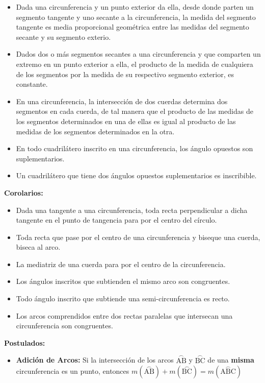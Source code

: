 \documentclass[•]{article}
\begin{document}
\begin{flushleft}
\begin{itemize}
			\item Dada una circunferencia y un punto exterior da ella, desde donde parten un segmento tangente y uno secante a la circunferencia, la medida del segmento tangente es media proporcional geom\'etrica entre las medidas del segmento secante y su segmento exterio.
			
			\item Dados dos o m\'as segmentos secantes a una circunferencia y que comparten un extremo en un punto exterior a ella, el producto de la medida de cualquiera de los segmentos por la medida de su respectivo segmento exterior, es constante.
			
			\item En una circunferencia, la intersecci\'on de dos cuerdas determina dos segmentos en cada cuerda, de tal manera que el producto de las medidas de los segmentos determinados en una de ellas es igual al producto de las medidas de los segmentos determinados en la otra.
			
			\item En todo cuadril\'atero inscrito en una circunferencia, los \'angulo opuestos son suplementarios.
			
			\item Un cuadril\'atero que tiene dos \'angulos opuestos suplementarios es inscribible.
			
		\end{itemize}
		
		\textbf{Corolarios: }
		\begin{itemize}
			\item Dada una tangente a una circunferencia, toda recta perpendicular a dicha tangente en el punto de tangencia para por el centro del c\'irculo.
			\item Toda recta que pase por el centro de una circunferencia y biseque una cuerda, biseca al arco.
			\item La mediatriz de una cuerda para por el centro de la circunferencia.
			\item Los \'angulos inscritos que subtienden el mismo arco son congruentes.
			\item Todo \'angulo inscrito que subtiende una semi-circunferencia es recto.
			\item Los arcos comprendidos entre dos rectas paralelas que intersecan una circunferencia son congruentes.
		\end{itemize}
		
		
		\textbf{Postulados: }
		\begin{itemize}
			\item \textbf{Adici\'on de Arcos: }Si la intersecci\'on de los arcos  $\stackrel{\textstyle\frown}{\mathrm{AB}}$ y $\stackrel{\textstyle\frown}{\mathrm{BC}}$ de una \textbf{misma} circunferencia es un punto, entonces $m(\stackrel{\textstyle\frown}{\mathrm{AB}}) + m(\stackrel{\textstyle\frown}{\mathrm{BC}}) = m(\stackrel{\textstyle\frown}{\mathrm{ABC}})$
		\end{itemize}
	\end{flushleft}
\end{document}
